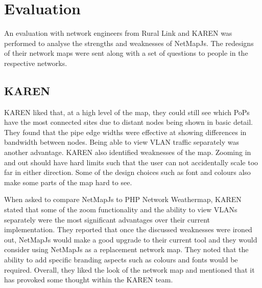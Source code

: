 \documentclass[11pt, a4paper]{article}
\begin{document}
\section{Evaluation}
\label{sec:evaluation}

An evaluation with network engineers from Rural Link and KAREN was performed to
analyse the strengths and weaknesses of NetMapJs. The redesigns of their network
maps were sent along with a set of questions to people in the respective
networks.

\subsection{KAREN}

KAREN liked that, at a high level of the map, they could still see which PoPs
have the most connected sites due to distant nodes being shown in basic detail.
They found that the pipe edge widths were effective at showing differences in
bandwidth between nodes. Being able to view VLAN traffic separately was another
advantage. KAREN also identified weaknesses of the map. Zooming in and out
should have hard limits such that the user can not accidentally scale too far in
either direction. Some of the design choices such as font and colours also make
some parts of the map hard to see. 

When asked to compare NetMapJs to PHP Network Weathermap, KAREN stated that some
of the zoom functionality and the ability to view VLANs separately were the most
significant advantages over their current implementation. They reported that
once the discussed weaknesses were ironed out, NetMapJs would make a good upgrade
to their current tool and they would consider using NetMapJs as a replacement
network map. They noted that the ability to add specific branding aspects such as
colours and fonts would be required. Overall, they liked the look of the network
map and mentioned that it has provoked some thought within the KAREN team.
\end{document}
